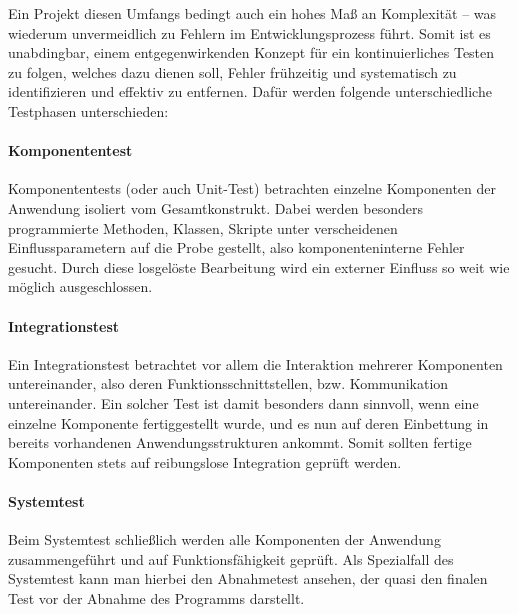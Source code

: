 Ein Projekt diesen Umfangs bedingt auch ein hohes Maß an Komplexität – was wiederum unvermeidlich zu Fehlern im Entwicklungsprozess führt. Somit ist es unabdingbar, einem entgegenwirkenden Konzept für ein kontinuierliches Testen zu folgen, welches dazu dienen soll, Fehler frühzeitig und systematisch zu identifizieren und effektiv zu entfernen. Dafür werden folgende unterschiedliche Testphasen unterschieden:

\paragraph{Komponententest}
Komponententests (oder auch Unit-Test) betrachten einzelne Komponenten der Anwendung isoliert vom Gesamtkonstrukt. Dabei werden besonders programmierte Methoden, Klassen, Skripte unter verscheidenen Einflussparametern auf die Probe gestellt, also komponenteninterne Fehler gesucht. Durch diese losgelöste Bearbeitung wird ein externer Einfluss so weit wie möglich ausgeschlossen.

\paragraph{Integrationstest}
Ein Integrationstest betrachtet vor allem die Interaktion mehrerer Komponenten untereinander, also deren Funktionsschnittstellen, bzw. Kommunikation untereinander. Ein solcher Test ist damit besonders dann sinnvoll, wenn eine einzelne Komponente fertiggestellt wurde, und es nun auf deren Einbettung in bereits vorhandenen Anwendungsstrukturen ankommt. Somit sollten fertige Komponenten stets auf reibungslose Integration geprüft werden.

\paragraph{Systemtest}
Beim Systemtest schließlich werden alle Komponenten der Anwendung zusammengeführt und auf Funktionsfähigkeit geprüft. Als Spezialfall des Systemtest kann man hierbei den Abnahmetest ansehen, der quasi den finalen Test vor der Abnahme des Programms darstellt.



